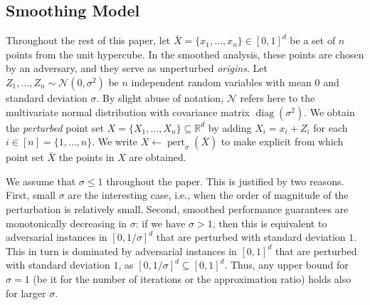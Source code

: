 \documentclass[11pt,DIV=12,a4paper]{scrartcl}
\newcommand{\real}{\ensuremath{\mathbb{R}}}
\DeclareMathOperator{\diag}{diag}
\DeclareMathOperator{\pert}{pert}
\begin{document}
\subsection{Smoothing Model}

Throughout the rest of this paper, let $\bar X = \{x_1, \ldots, x_n\} \in [0,1]^d$ be a set of $n$ points from the unit hypercube.
In the smoothed analysis, these points are chosen by an adversary, and they serve as unperturbed \emph{origins}.
Let $Z_1, \ldots, Z_n \sim \mathcal N (0, \sigma^2)$ be $n$ independent random variables with mean $0$ and standard deviation $\sigma$.
By slight abuse of notation, $\mathcal N$ refers here to the multivariate normal distribution with covariance
matrix $\diag(\sigma^2)$.
We obtain the \emph{perturbed} point set $X = \{X_1, \ldots, X_n\} \subseteq \real^d$ by adding $X_i = x_i + Z_i$ for each $i \in [n] = \{1, \ldots, n\}$.
We write $X \leftarrow \pert_\sigma(\bar X)$ to make explicit from which
point set $\bar X$ the points in $X$ are obtained.



We assume that $\sigma \leq 1$ throughout the paper. This is justified by two reasons.
First, small $\sigma$ are the interesting case, i.e.,
when the order of magnitude of the perturbation is relatively small.
Second,
smoothed performance guarantees are monotonically decreasing
in $\sigma$: if we have $\sigma > 1$, then this is equivalent
to adversarial instances in $[0, 1/\sigma]^d$ that are perturbed with standard deviation $1$.
This in turn is dominated by adversarial instances in $[0,1]^d$ that are perturbed with standard deviation $1$,
as $[0,1/\sigma]^d \subseteq [0,1]^d$. Thus, any upper bound for $\sigma = 1$ (be it for the number of iterations or the approximation ratio)
holds also for larger $\sigma$.


\end{document}
